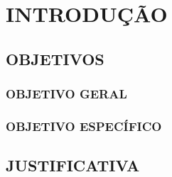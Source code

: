 \chapter{INTRODUÇÃO}
\label{cap:introducao}








\section{OBJETIVOS}
\label{sec:objetivos}

\subsection{OBJETIVO GERAL}
\label{sec:objetivo-geral}




\subsection{OBJETIVO ESPECÍFICO}
\label{sec:objetivos-especificos}



\section{JUSTIFICATIVA}
\label{sec:justificativa}
